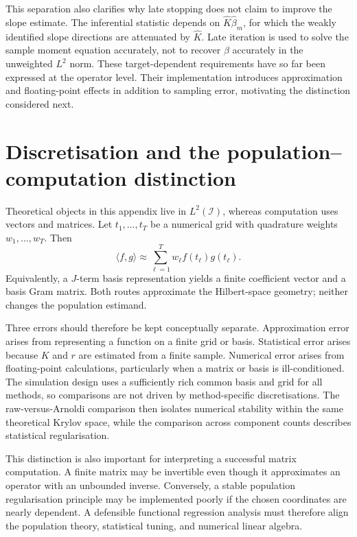 This separation also clarifies why late stopping does not claim to improve the slope estimate. The inferential statistic depends on $\widehat K\widehat\beta_m$, for which the weakly identified slope directions are attenuated by $\widehat K$. Late iteration is used to solve the sample moment equation accurately, not to recover $\beta$ accurately in the unweighted $L^2$ norm. These target-dependent requirements have so far been expressed at the operator level. Their implementation introduces approximation and floating-point effects in addition to sampling error, motivating the distinction considered next.

\section{Discretisation and the population--computation distinction}
\label{sec:discretisation-distinction}

Theoretical objects in this appendix live in $L^2(\mathcal I)$, whereas computation uses vectors and matrices. Let $t_1,\ldots,t_T$ be a numerical grid with quadrature weights $w_1,\ldots,w_T$. Then
\begin{equation}
    \langle f,g\rangle
    \approx\sum_{\ell=1}^{T}w_\ell f(t_\ell)g(t_\ell).
    \label{eq:quadrature-inner-product}
\end{equation}
Equivalently, a $J$-term basis representation yields a finite coefficient vector and a basis Gram matrix. Both routes approximate the Hilbert-space geometry; neither changes the population estimand.

Three errors should therefore be kept conceptually separate. Approximation error arises from representing a function on a finite grid or basis. Statistical error arises because $K$ and $r$ are estimated from a finite sample. Numerical error arises from floating-point calculations, particularly when a matrix or basis is ill-conditioned. The simulation design uses a sufficiently rich common basis and grid for all methods, so comparisons are not driven by method-specific discretisations. The raw-versus-Arnoldi comparison then isolates numerical stability within the same theoretical Krylov space, while the comparison across component counts describes statistical regularisation.

This distinction is also important for interpreting a successful matrix computation. A finite matrix may be invertible even though it approximates an operator with an unbounded inverse. Conversely, a stable population regularisation principle may be implemented poorly if the chosen coordinates are nearly dependent. A defensible functional regression analysis must therefore align the population theory, statistical tuning, and numerical linear algebra.

